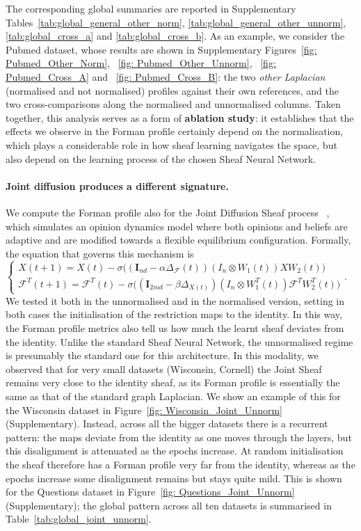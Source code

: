The corresponding global summaries are reported in Supplementary Tables~\ref{tab:global_general_other_norm}, \ref{tab:global_general_other_unnorm}, \ref{tab:global_cross_a} and \ref{tab:global_cross_b}.
As an example, we consider the Pubmed dataset, whose results are shown in
Supplementary Figures~\ref{fig: Pubmed_Other_Norm}, ~\ref{fig: Pubmed_Other_Unnorm},
~\ref{fig: Pubmed_Cross_A} and ~\ref{fig: Pubmed_Cross_B}: the two \emph{other
Laplacian} (normalised and not normalised) profiles against their own references, and the two cross-comparisons along
the normalised and unnormalised columns.
\newline 
Taken together, this analysis serves as a form of \textbf{ablation study}: it establishes that the effects we observe in the Forman profile certainly depend on the normalisation, which plays a considerable role in how sheaf learning navigates the space, but also depend on the learning process of the chosen Sheaf Neural Network.

\paragraph{Joint diffusion produces a different signature.}

We compute the Forman profile also for the Joint Diffusion Sheaf process ~\cite{caralt2024jointdiffusionprocessesinductive}, which simulates an opinion dynamics model where both opinions and beliefs are adaptive and are modified towards a flexible equilibrium configuration.
Formally, the equation that governs this mechanism is $\begin{cases}
X(t+1) = X(t) - \sigma\big((\mathbf{I}_{nd} - \alpha \Delta_{\mathcal{F}}(t))(I_n \otimes W_1(t))XW_2(t)\big) \\
\mathcal{F}^T(t+1) = \mathcal{F}^T(t) - \sigma\big((\mathbf{I}_{2md} - \beta \Delta_{X(t)})(I_n \otimes W_1^T(t))\mathcal{F}^TW_2^T(t)\big)
\end{cases}$.
We tested it both in the unnormalised and in the normalised version, setting in both cases the initialisation of the restriction maps to the identity.
In this way, the Forman profile metrics also tell us how much the learnt sheaf deviates from the identity.
Unlike the standard Sheaf Neural Network, the unnormalised regime is presumably the standard one for this architecture.
In this modality, we observed that for very small datasets (Wisconsin, Cornell) the Joint Sheaf remains very close to the identity sheaf, as its Forman profile is essentially the same as that of the standard graph Laplacian. We show an example of this for the Wisconsin dataset in Figure~\ref{fig: Wisconsin_Joint_Unnorm} (Supplementary).
Instead, across all the bigger datasets there is a recurrent pattern: the maps deviate from the identity as one moves through the layers, but this disalignment is attenuated as the epochs increase. At random initialisation the sheaf therefore has a Forman profile very far from the identity, whereas as the epochs increase some disalignment remains but stays quite mild.
This is shown for the Questions dataset in Figure~\ref{fig: Questions_Joint_Unnorm} (Supplementary); the global pattern across all ten datasets is summarised in Table~\ref{tab:global_joint_unnorm}.

